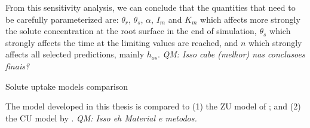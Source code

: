 {\tred From this sensitivity analysis, we can conclude that the quantities that need to be carefully parameterized are: $\theta_r$, $\theta_s$, $\alpha$, $I_m$ and $K_m$ which affects more strongly the solute concentration at the root surface in the end of simulation, $\theta_s$ which strongly affects the time at the limiting values are reached, and $n$ which strongly affects all selected predictions, mainly $h_{os}$. {\it QM: Isso cabe (melhor) nas conclusoes finais?}}



{\tred
}


\sec Solute uptake models comparison


{\tred The model developed in this thesis is compared to 
(1) the ZU model of \citeonline[liersolute]; and
(2) the CU model by \citeonline[willigen1]. {\it QM: Isso eh Material e metodos.}}


